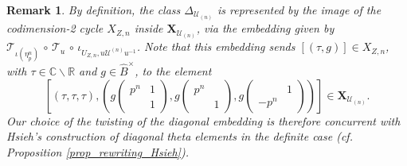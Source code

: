 \documentclass{amsart}
\numberwithin{equation}{section}
\newtheorem{remark}[theorem]{Remark}
\newcommand{\CC}{\mathbb{C}}
\begin{document}
\begin{remark}
\label{remark_2025_03_2025_1427}
By definition, the class $\Delta_{\mathcal{U}_{(n)}} $  is represented by the image of the codimension-2 cycle $X_{Z,n}$ inside $\mathbf{X}_{\mathcal{U}_{(n)}}$, via the embedding  given by $\mathcal{T}_{\iota(\eta_p^n)} \,\circ\, \mathcal{T}_{u} \,\circ \,\iota_{U_{Z,n}, u \mathcal{U}^{(n)} u^{-1}}$. Note that this embedding sends $ [(\tau,g)] \in X_{Z,n}$, with $\tau \in \CC \smallsetminus \mathbb{R}$ and $g \in \widehat{B}^{ \times}$, to the element
$$
[(\tau, \tau,\tau), \left( g \left( \begin{smallmatrix} p^n & 1 \\ & 1 \end{smallmatrix} \right),  g \left( \begin{smallmatrix}
    p^n &  \\  & 1 
\end{smallmatrix} \right), g  \left( \begin{smallmatrix}
  & 1 \\ -p^n  &   
\end{smallmatrix} \right) \right)  ] \in \mathbf{X}_{\mathcal{U}_{(n)}}.
$$
Our choice of the twisting of the diagonal embedding is therefore concurrent with Hsieh's construction of diagonal theta elements in the definite case (\textit{cf}. Proposition \ref{prop_rewriting_Hsieh}).
\end{remark}
\end{document}
